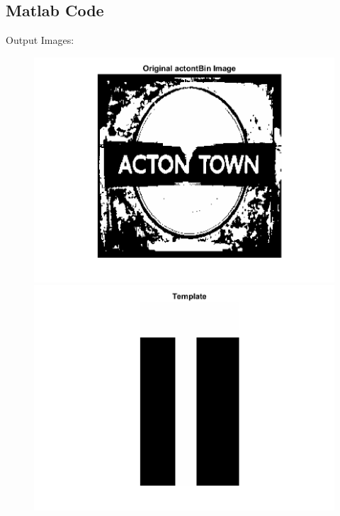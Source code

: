 \documentclass[11pt]{article} %
\begin{document}
\subsection*{Matlab Code}

Output Images:
\begin{figure}
 \centering
\includegraphics{Original_ActonBin.png}
\includegraphics{Template.png}
\end{figure}
\end{document}
